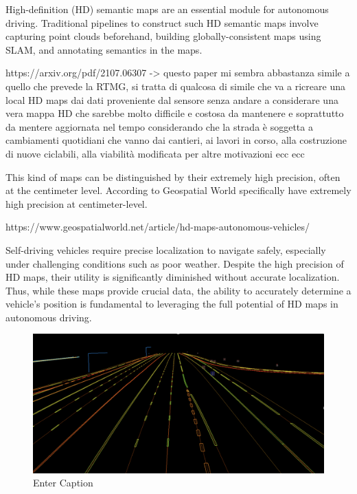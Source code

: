 High-definition (HD) semantic maps are an essential module for autonomous driving. Traditional pipelines to construct
such HD semantic maps involve capturing point clouds beforehand, building globally-consistent maps using SLAM,
and annotating semantics in the maps. 

https://arxiv.org/pdf/2107.06307 -> questo paper mi sembra abbastanza simile a quello che prevede la RTMG, si tratta di qualcosa di simile che va a ricreare una local HD maps dai dati proveniente dal sensore senza andare a considerare una vera mappa HD che sarebbe molto difficile e costosa da mantenere e soprattutto da mentere aggiornata nel tempo considerando che la strada è soggetta a cambiamenti quotidiani che vanno dai cantieri, ai lavori in corso, alla costruzione di nuove ciclabili, alla viabilità modificata per altre motivazioni ecc ecc


This kind of maps can be distinguished by their extremely high precision, often at the centimeter level. According to Geospatial World specifically have extremely high precision at centimeter-level.

https://www.geospatialworld.net/article/hd-maps-autonomous-vehicles/

Self-driving vehicles require precise localization to navigate safely, especially under challenging conditions such as poor weather. 
Despite the high precision of HD maps, their utility is significantly diminished without accurate localization. Thus, while these maps provide crucial data, the ability to accurately determine a vehicle's position is fundamental to leveraging the full potential of HD maps in autonomous driving.

\begin{figure}
    \centering
    \includegraphics[width=1\linewidth]{LateX/figs/Screenshot-2021-07-16-at-17.00.59-e1626451336528.png}
    \caption{Enter Caption}
    \label{fig:enter-label}   
\end{figure}


